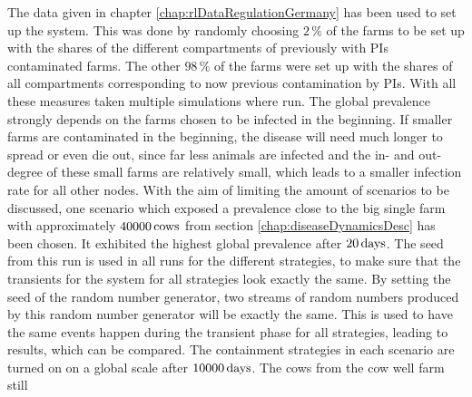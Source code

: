 The data given in chapter \ref {chap:rlDataRegulationGermany} has been used to set up the system. This was done by randomly choosing $2\,\%$ of the farms to be set up with the shares of the different compartments of previously with PIs contaminated farms. The other $98\,\%$ of the farms were set up with the shares of all compartments corresponding to now previous contamination by PIs. With all these measures taken multiple simulations where run. The global prevalence strongly depends on the farms chosen to be infected in the beginning. If smaller farms are contaminated in the beginning, the disease will need much longer to spread or even die out, since far less animals are infected and the in- and out-degree of these small farms are relatively small, which leads to a smaller infection rate for all other nodes. With the aim of limiting the amount of scenarios to be discussed, one scenario which exposed a prevalence close to the big single farm with approximately $40000\,\text{cows}$ from section \ref{chap:diseaseDynamicsDesc} has been chosen. It exhibited the highest global prevalence after $20\,\text{days}$. The seed from this run is used in all runs for the different strategies, to make sure that the transients for the system for all strategies look exactly the same. By setting the seed of the random number generator, two streams of random numbers produced by this random number generator will be exactly the same. This is used to have the same events happen during the transient phase for all strategies, leading to results, which can be compared. The containment strategies in each scenario are turned on on a global scale after $10000\,\text{days}$. The cows from the cow well farm still 

